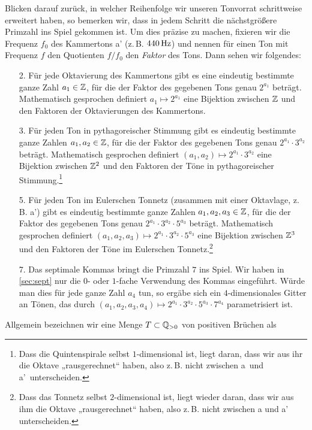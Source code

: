 Blicken darauf zurück, in welcher Reihenfolge wir unseren Tonvorrat schrittweise
erweitert haben, so bemerken wir, dass in jedem Schritt die nächstgrößere
Primzahl ins Spiel gekommen ist. Um dies präzise zu machen, fixieren wir die
Frequenz $f_0$ des Kammertons a’ (z.\,B. $440\,\text{Hz}$) und nennen für einen Ton mit
Frequenz $f$ den Quotienten $f/f_0$ den \emph{Faktor} des Tons. Dann sehen wir
folgendes:
\begin{enumerate}
\item[2.] Für jede Oktavierung des Kammertons gibt es eine eindeutig bestimmte
  ganze Zahl $a_1\in\mathbb{Z}$, für die der Faktor des gegebenen Tons genau $2^{a_1}$
  beträgt. Mathematisch gesprochen definiert $a_1\mapsto 2^{a_1}$ eine Bijektion
  zwischen $\mathbb{Z}$ und den Faktoren der Oktavierungen des Kammertons.
\item[3.] Für jeden Ton in pythagoreischer Stimmung gibt es eindeutig bestimmte
  ganze Zahlen $a_1,a_2\in\mathbb{Z}$, für die der Faktor des gegebenen Tons genau
  $2^{a_1}\cdot 3^{a_2}$ beträgt. Mathematisch gesprochen definiert
  $(a_1,a_2)\mapsto 2^{a_1}\cdot 3^{a_2}$ eine Bijektion zwischen $\mathbb{Z}^2$ und den Faktoren
  der Töne in pythagoreischer Stimmung.\footnote{Dass die Quintenspirale selbst
    $1$-dimensional ist, liegt daran, dass wir aus ihr die Oktave
    „rausgerechnet“ haben, also z.\,B. nicht zwischen \flat a\ und \flat a'\
    unterscheiden.}
\item[5.] Für jeden Ton im Eulerschen Tonnetz (zusammen mit einer Oktavlage,
  z.\,B. \flatp a’) gibt es eindeutig bestimmte ganze Zahlen $a_1,a_2,a_3\in\mathbb{Z}$,
  für die der Faktor des gegebenen Tons genau
  $2^{a_1}\cdot 3^{a_2}\cdot 5^{a_3}$ beträgt.  Mathematisch gesprochen
  definiert $(a_1,a_2,a_3)\mapsto 2^{a_1}\cdot 3^{a_2}\cdot 5^{a_3}$ eine
  Bijektion zwischen $\mathbb{Z}^3$ und den Faktoren der Töne im Eulerschen
  Tonnetz.\footnote{Dass das Tonnetz selbst $2$-dimensional ist, liegt wieder
    daran, dass wir aus ihm die Oktave „rausgerechnet“ haben, also z.\,B. nicht
    zwischen \flatp a und \flatp a’ unterscheiden.}
\item[7.] Das septimale Kommas bringt die Primzahl $7$ ins Spiel. Wir haben in
  \cref{sec:sept} nur die $0$- oder $1$-fache Verwendung des Kommas
  eingeführt. Würde man dies für jede ganze Zahl $a_4$ tun, so ergäbe sich ein
  $4$-dimensionales Gitter an Tönen, das durch
  $(a_1,a_2,a_3,a_4)\mapsto 2^{a_1}\cdot 3^{a_2}\cdot 5^{a_3}\cdot 7^{a_4}$
  parametrisiert ist.
\end{enumerate}
Allgemein bezeichnen wir eine Menge $T\subset \mathbb{Q}_{>0}$ von positiven Brüchen als
